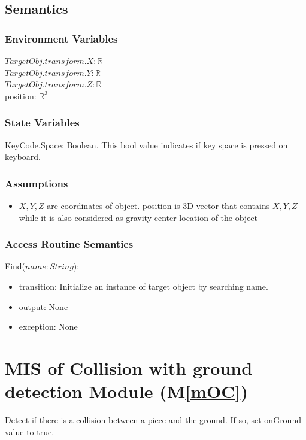 \documentclass[12pt, titlepage]{article}
\newcommand{\mref}[1]{M\ref{#1}}
\begin{document}
\subsection{Semantics}

\subsubsection{Environment Variables}
$TargetObj.transform.X: \mathbb{R}$\\
$TargetObj.transform.Y: \mathbb{R}$\\
$TargetObj.transform.Z: \mathbb{R}$\\
position: $\mathbb{R}^{3}$
\subsubsection{State Variables}

KeyCode.Space: Boolean.
This bool value indicates if key space is pressed on keyboard.

\subsubsection{Assumptions}

\noindent
\begin{itemize}
	\item $X,Y,Z$ are coordinates of object. position is 3D vector that contains $X,Y,Z$ while it is also considered as gravity center location of the object
\end{itemize}

\subsubsection{Access Routine Semantics}

\noindent Find($name: String$):
\begin{itemize}
	\item transition: Initialize an instance of target object by searching name.
	\item output: None
	\item exception: None
\end{itemize}


\section{MIS of Collision with ground detection Module (\mref{mOC})}

Detect if there is a collision between a piece and the ground. If so, set onGround
value to true.
\end{document}

